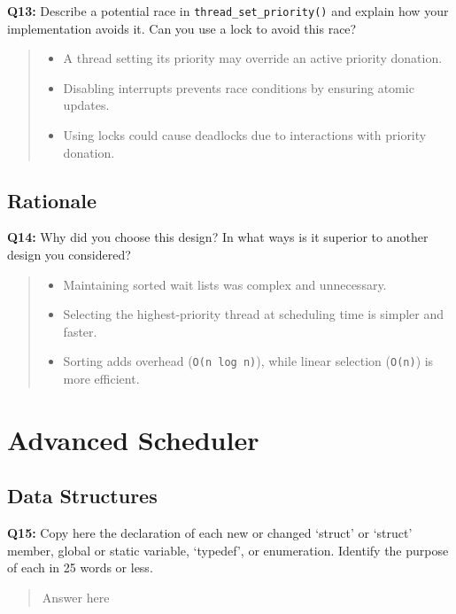 \documentclass[a4paper,11pt]{paper}
\begin{document}
\textbf{Q13:} Describe a potential race in \texttt{thread\_set\_priority()} and
explain how your implementation avoids it. Can you use a lock to avoid this
race?

\begin{quote}
  \begin{itemize}
    \item A thread setting its priority may override an active priority donation.
    \item Disabling interrupts prevents race conditions by ensuring atomic updates.
    \item Using locks could cause deadlocks due to interactions with priority donation.
\end{itemize}
\end{quote}

\subsection{Rationale}

\textbf{Q14:} Why did you choose this design?  In what ways is it superior to
another design you considered?

\begin{quote}
  \begin{itemize}
    \item Maintaining sorted wait lists was complex and unnecessary.
    \item Selecting the highest-priority thread at scheduling time is simpler and faster.
    \item Sorting adds overhead (\texttt{O(n log n)}), while linear selection (\texttt{O(n)}) is more efficient.
\end{itemize}
\end{quote}

\section{Advanced Scheduler}

\subsection{Data Structures}

\textbf{Q15:} Copy here the declaration of each new or changed `struct' or
`struct' member, global or static variable, `typedef', or enumeration.  Identify
the purpose of each in 25 words or less.

\begin{quote}
  Answer here
\end{quote}
\end{document}
